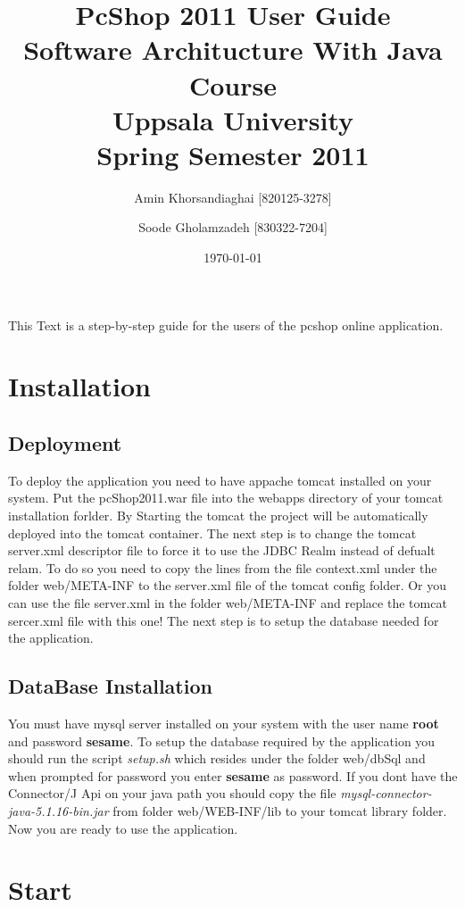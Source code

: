 \documentclass[a4paper,12pt]{article}
\title{PcShop 2011 User Guide \\
    Software Architucture With Java Course \\ Uppsala University \\
    Spring Semester 2011} %
\author{  Amin Khorsandiaghai [820125-3278]\and Soode Gholamzadeh [830322-7204]} %
\date{\today}
\begin{document}
\maketitle

This Text is a step-by-step guide for the users of the pcshop online application.
 

\section*{Installation}

\subsection*{Deployment}

To deploy the application you need to have appache tomcat installed on your system.
Put the pcShop2011.war file into the webapps directory of your tomcat installation forlder.
By Starting the tomcat the project will be automatically deployed into the tomcat container.
The next step is to change the tomcat server.xml descriptor file to force it to use the JDBC Realm instead of defualt relam.
To do so you need to copy the lines from the file context.xml under the folder web/META-INF to the server.xml file of the tomcat config folder.
Or you can use the file server.xml in the folder web/META-INF and replace the tomcat sercer.xml file with this one!
The next step is to setup the database needed for the application.



\subsection*{DataBase Installation}

You must have mysql server installed on your system with the user name {\bf root} and password {\bf sesame}.
To setup the database required by the application you should run the script {\it setup.sh} which resides under the folder web/dbSql 
and when prompted for password you enter {\bf sesame} as password.
If you dont have the Connector/J Api on your java path you should copy the file {\it mysql-connector-java-5.1.16-bin.jar} from folder
web/WEB-INF/lib to your tomcat library folder.
Now you are ready to use the application.


\section*{Start}
\end{document}
